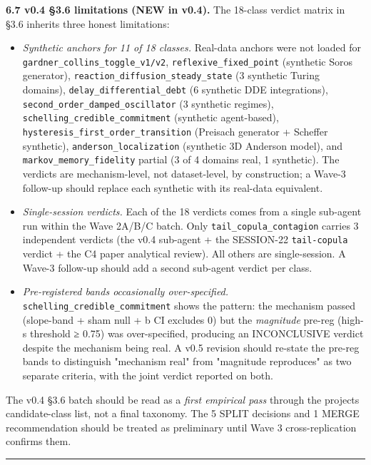 \documentclass[
  11pt]{article}
\providecommand{\tightlist}{%
  \setlength{\itemsep}{0pt}\setlength{\parskip}{0pt}}
\begin{document}
\textbf{6.7 v0.4 §3.6 limitations (NEW in v0.4).} The 18-class verdict
matrix in §3.6 inherits three honest limitations:

\begin{itemize}
\tightlist
\item
  \emph{Synthetic anchors for 11 of 18 classes.} Real-data anchors were
  not loaded for \texttt{gardner\_collins\_toggle\_v1/v2},
  \texttt{reflexive\_fixed\_point} (synthetic Soros generator),
  \texttt{reaction\_diffusion\_steady\_state} (3 synthetic Turing
  domains), \texttt{delay\_differential\_debt} (6 synthetic DDE
  integrations), \texttt{second\_order\_damped\_oscillator} (3 synthetic
  regimes), \texttt{schelling\_credible\_commitment} (synthetic
  agent-based), \texttt{hysteresis\_first\_order\_transition} (Preisach
  generator + Scheffer synthetic), \texttt{anderson\_localization}
  (synthetic 3D Anderson model), and \texttt{markov\_memory\_fidelity}
  partial (3 of 4 domains real, 1 synthetic). The verdicts are
  mechanism-level, not dataset-level, by construction; a Wave-3
  follow-up should replace each synthetic with its real-data equivalent.
\item
  \emph{Single-session verdicts.} Each of the 18 verdicts comes from a
  single sub-agent run within the Wave 2A/B/C batch. Only
  \texttt{tail\_copula\_contagion} carries 3 independent verdicts
  (the v0.4 sub-agent + the SESSION-22 \texttt{tail-copula} verdict +
  the C4 paper analytical review). All others are single-session. A
  Wave-3 follow-up should add a second sub-agent verdict per class.
\item
  \emph{Pre-registered bands occasionally over-specified.}
  \texttt{schelling\_credible\_commitment} shows the pattern: the
  mechanism passed (slope-band + sham null + b CI excludes 0) but the
  \emph{magnitude} pre-reg (high-s threshold ≥ 0.75) was over-specified,
  producing an INCONCLUSIVE verdict despite the mechanism being real. A
  v0.5 revision should re-state the pre-reg bands to distinguish
  "mechanism real" from "magnitude reproduces" as two separate criteria,
  with the joint verdict reported on both.
\end{itemize}

The v0.4 §3.6 batch should be read as a \emph{first empirical pass}
through the project\textquotesingle s candidate-class list, not a final
taxonomy. The 5 SPLIT decisions and 1 MERGE recommendation should be
treated as preliminary until Wave 3 cross-replication confirms them.

\begin{center}\rule{0.5\linewidth}{0.5pt}\end{center}
\end{document}
